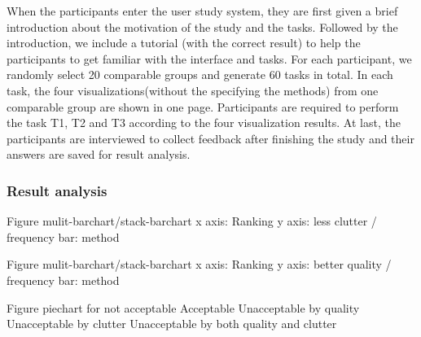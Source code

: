 When the participants enter the user study system, they are first given a brief introduction about the motivation of the study and the tasks.
Followed by the introduction, we include a tutorial (with the correct result) to help the participants to get familiar with the interface and tasks.
For each participant, we randomly select 20 comparable groups and generate 60 tasks in total.
In each task, the four visualizations(without the specifying the methods) from one comparable group are shown in one page.
Participants are required to perform the task T1, T2 and T3 according to the four visualization results.
At last, the participants are interviewed to collect feedback after finishing the study and their answers are saved for result analysis.

\subsubsection{Result analysis}

Figure mulit-barchart/stack-barchart
x axis: Ranking 
y axis: less clutter / frequency
bar: method

Figure mulit-barchart/stack-barchart
x axis: Ranking 
y axis: better quality / frequency
bar: method

Figure piechart for not acceptable
Acceptable
Unacceptable by quality
Unacceptable by clutter
Unacceptable by both quality and clutter